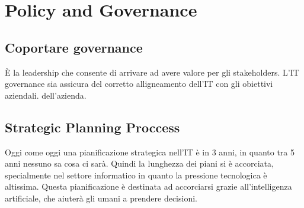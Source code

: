 \chapter{Policy and Governance}

\section{Coportare governance}

È la leadership che consente di arrivare ad avere valore per gli stakeholders.
L'IT governance sia assicura del corretto alligneamento dell'IT con gli 
obiettivi aziendali. dell'azienda.



\section{Strategic Planning Proccess}

Oggi come oggi una pianificazione strategica nell'IT è in 3 anni, in quanto tra 
5 anni nessuno sa cosa ci sarà. Quindi la lunghezza dei piani si è accorciata, 
specialmente nel settore informatico in quanto la pressione tecnologica è 
altissima. Questa pianificazione è destinata ad accorciarsi grazie 
all'intelligenza artificiale, che aiuterà gli umani a prendere decisioni.
